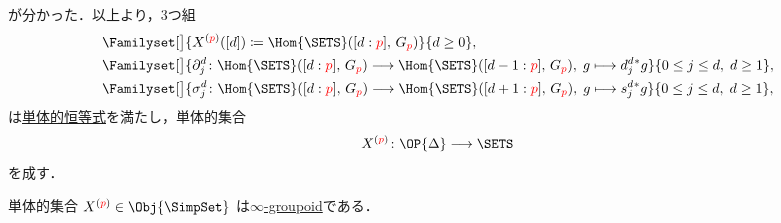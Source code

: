 \documentclass[TQFT_main]{subfiles}
\begin{document}
が分かった．以上より，3つ組
\begin{align}
    &\Familyset[\big]{X^{(\textcolor{red}{p})}([d]) \coloneqq \Hom{\SETS}([d: \textcolor{red}{p}],\, G_{\textcolor{red}{p}})}{d \ge 0}, \\
    &\Familyset[\big]{\partial_j^d \colon \Hom{\SETS}([d: \textcolor{red}{p}],\, G_{\textcolor{red}{p}}) \lto \Hom{\SETS}([d-1: \textcolor{red}{p}],\, G_{\textcolor{red}{p}}),\; g \lmto d^d_j{}^* g}{0 \le j \le d,\;d \ge 1}, \label{eq:hg-face}\\
    &\Familyset[\big]{\sigma_j^d \colon \Hom{\SETS}([d: \textcolor{red}{p}],\, G_{\textcolor{red}{p}}) \lto \Hom{\SETS}([d+1: \textcolor{red}{p}],\, G_{\textcolor{red}{p}}),\; g \lmto s^d_j{}^* g}{  0 \le j \le d,\;d \ge 1}, \label{eq:hg-degen}\\
\end{align}
は\hyperref[def:SimpSet]{単体的恒等式}を満たし，単体的集合
\begin{align}
    X^{(\textcolor{red}{p})} \colon \OP{\Delta} \lto \SETS
\end{align}
を成す．

\begin{mytheo}[label=thm:inftyGrpd]{}
    単体的集合 $X^{(\textcolor{red}{p})} \in \Obj{\SimpSet}$ は\hyperref[def:infinity-1]{$\infty$-groupoid}である．
\end{mytheo}
\end{document}
